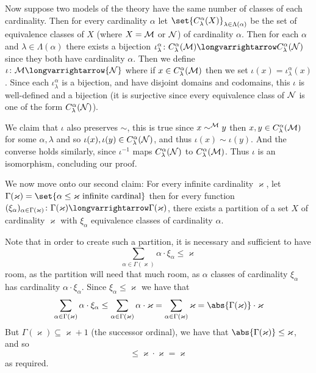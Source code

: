\documentclass[10pt]{article}
\let\longto=\longvarrightarrow
\def\mM{{\cal M}}
\def\mN{{\cal N}}
\begin{document}
            Now suppose two models of the theory have the same number of classes of each cardinality.
            Then for every cardinality $\alpha$ let $\set{C^\alpha_\lambda(X)}_{\lambda\in\Lambda(\alpha)}$ be the set of equivalence classes of $X$ (where $X=\mM$ or $\mN$) of cardinality $\alpha$.
            Then for each $\alpha$ and $\lambda\in\Lambda(\alpha)$ there exists a bijection $\iota^\alpha_\lambda\colon C^\alpha_\lambda(\mM)\longto C^\alpha_\lambda(\mN)$ since they both have cardinality
            $\alpha$.
            Then we define $\iota\colon\mM\longto\mN$ where if $x\in C^\alpha_\lambda(\mM)$ then we set $\iota(x)=\iota^\alpha_\lambda(x)$.
            Since each $\iota^\alpha_\lambda$ is a bijection, and have disjoint domains and codomains, this $\iota$ is well-defined and a bijection (it is surjective since every equivalence class of $\mN$ is
            one of the form $C^\alpha_\lambda(\mN)$).

            We claim that $\iota$ also preserves $\sim$, this is true since $x\sim^\mM y$ then $x,y\in C^\alpha_\lambda(\mM)$ for some $\alpha,\lambda$ and so $\iota(x),\iota(y)\in C^\alpha_\lambda(\mN)$,
            and thus $\iota(x)\sim\iota(y)$.
            And the converse holds similarly, since $\iota^{-1}$ maps $C^\alpha_\lambda(\mN)$ to $C^\alpha_\lambda(\mM)$.
            Thus $\iota$ is an isomorphism, concluding our proof.

            We now move onto our second claim:
            For every infinite cardinality $\varkappa$, let $\Gamma(\varkappa)=\set{\alpha\leq\varkappa\text{ infinite cardinal}}$ then for every function
            $(\xi_\alpha)_{\alpha\in\Gamma(\varkappa)}\colon\Gamma(\varkappa)\longto\Gamma(\varkappa)$, there exists a partition of a set $X$ of cardinality $\varkappa$ with
            $\xi_\alpha$ equivalence classes of cardinality $\alpha$.

            Note that in order to create such a partition, it is necessary and sufficient to have
            \[ \sum_{\alpha\in\Gamma(\varkappa)}\alpha\cdot\xi_\alpha\leq \varkappa \]
            room, as the partition will need that much room, as $\alpha$ classes of cardinality $\xi_\alpha$ has cardinality $\alpha\cdot\xi_\alpha$.
            Since $\xi_\alpha\leq\varkappa$ we have that
            \[ \sum_{\alpha\in\Gamma(\varkappa)}\alpha\cdot\xi_\alpha \leq \sum_{\alpha\in\Gamma(\varkappa)}\alpha\cdot\varkappa = \sum_{\alpha\in\Gamma(\varkappa)}\varkappa =
            \abs{\Gamma(\varkappa)}\cdot\varkappa \]
            But $\Gamma(\varkappa)\subseteq\varkappa+1$ (the successor ordinal), we have that $\abs{\Gamma(\varkappa)}\leq\varkappa$, and so
            \[ \leq \varkappa\cdot\varkappa = \varkappa \]
            as required.
\end{document}
